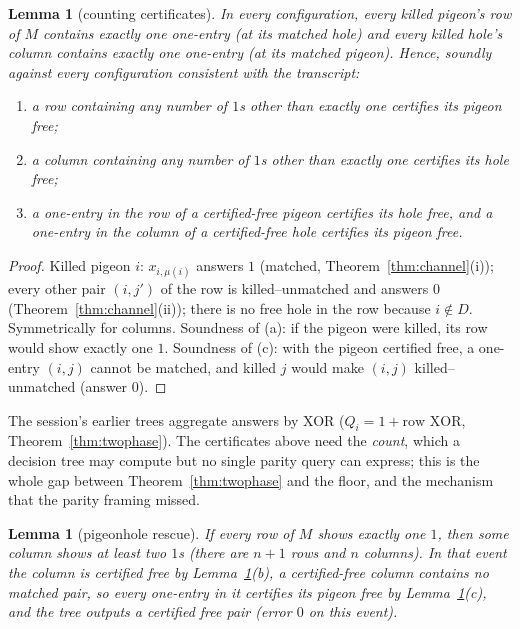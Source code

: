 \documentclass[11pt]{article}
\newtheorem{lemma}[theorem]{Lemma}
\theoremstyle{definition}
\theoremstyle{remark}
\begin{document}
\begin{lemma}[counting certificates]\label{lem:certificates}
In every configuration, every killed pigeon's row of $M$ contains
exactly one one-entry (at its matched hole) and every killed hole's
column contains exactly one one-entry (at its matched pigeon).  Hence,
soundly against every configuration consistent with the transcript:
\begin{enumerate}
\item[(a)] a row containing any number of $1$s other than exactly one
certifies its pigeon free;
\item[(b)] a column containing any number of $1$s other than exactly
one certifies its hole free;
\item[(c)] a one-entry in the row of a certified-free pigeon certifies
its hole free, and a one-entry in the column of a certified-free hole
certifies its pigeon free.
\end{enumerate}
\end{lemma}

\begin{proof}
Killed pigeon $i$: $x_{i,\mu(i)}$ answers $1$ (matched,
Theorem~\ref{thm:channel}(i)); every other pair $(i,j')$ of the row is
killed--unmatched and answers $0$ (Theorem~\ref{thm:channel}(ii));
there is no free hole in the row because $i\notin D$.  Symmetrically
for columns.  Soundness of (a): if the pigeon were killed, its row
would show exactly one $1$.  Soundness of (c): with the pigeon
certified free, a one-entry $(i,j)$ cannot be matched, and killed $j$
would make $(i,j)$ killed--unmatched (answer $0$).
\end{proof}

The session's earlier trees aggregate answers by XOR
($Q_i=1+\text{row XOR}$, Theorem~\ref{thm:twophase}).  The certificates
above need the \emph{count}, which a decision tree may compute but no
single parity query can express; this is the whole gap between
Theorem~\ref{thm:twophase} and the floor, and the mechanism that the
parity framing missed.

\begin{lemma}[pigeonhole rescue]\label{lem:rescue}
If every row of $M$ shows exactly one $1$, then some column shows at
least two $1$s (there are $n+1$ rows and $n$ columns).  In that event
the column is certified free by Lemma~\ref{lem:certificates}(b), a
certified-free column contains no matched pair, so every one-entry in
it certifies its pigeon free by Lemma~\ref{lem:certificates}(c), and
the tree outputs a \emph{certified} free pair (error $0$ on this
event).
\end{lemma}
\end{document}
